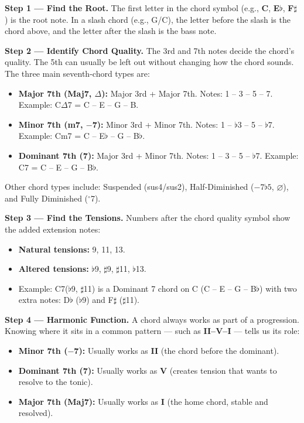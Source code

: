 \documentclass[a4paper]{article}
\begin{document}
\textbf{Step 1 --- Find the Root.} The first letter in the chord symbol (e.g., \textbf{C}, \textbf{E$\flat$}, \textbf{F$\sharp$}) is the root note. In a slash chord (e.g., G/C), the letter before the slash is the chord above, and the letter after the slash is the bass note.

\textbf{Step 2 --- Identify Chord Quality.} The 3rd and 7th notes decide the chord's quality. The 5th can usually be left out without changing how the chord sounds. The three main seventh-chord types are:
\begin{itemize}
    \item \textbf{Major 7th (Maj7, $\Delta$):} Major 3rd + Major 7th. Notes: 1 -- 3 -- 5 -- 7. Example: C$\Delta$7 = C -- E -- G -- B.
    \item \textbf{Minor 7th (m7, $-$7):} Minor 3rd + Minor 7th. Notes: 1 -- $\flat$3 -- 5 -- $\flat$7. Example: Cm7 = C -- E$\flat$ -- G -- B$\flat$.
    \item \textbf{Dominant 7th (7):} Major 3rd + Minor 7th. Notes: 1 -- 3 -- 5 -- $\flat$7. Example: C7 = C -- E -- G -- B$\flat$.
\end{itemize}
Other chord types include: Suspended (sus4/sus2), Half-Diminished ($-7\flat5$, $\varnothing$), and Fully Diminished ($^\circ$7).

\textbf{Step 3 --- Find the Tensions.} Numbers after the chord quality symbol show the added extension notes:
\begin{itemize}
    \item \textbf{Natural tensions:} 9, 11, 13.
    \item \textbf{Altered tensions:} $\flat$9, $\sharp$9, $\sharp$11, $\flat$13.
    \item Example: C7($\flat$9, $\sharp$11) is a Dominant 7 chord on C (C -- E -- G -- B$\flat$) with two extra notes: D$\flat$ ($\flat$9) and F$\sharp$ ($\sharp$11).
\end{itemize}

\textbf{Step 4 --- Harmonic Function.} A chord always works as part of a progression. Knowing where it sits in a common pattern --- such as \textbf{II--V--I} --- tells us its role:
\begin{itemize}
    \item \textbf{Minor 7th ($-$7):} Usually works as \textbf{II} (the chord before the dominant).
    \item \textbf{Dominant 7th (7):} Usually works as \textbf{V} (creates tension that wants to resolve to the tonic).
    \item \textbf{Major 7th (Maj7):} Usually works as \textbf{I} (the home chord, stable and resolved).
\end{itemize}
\end{document}
